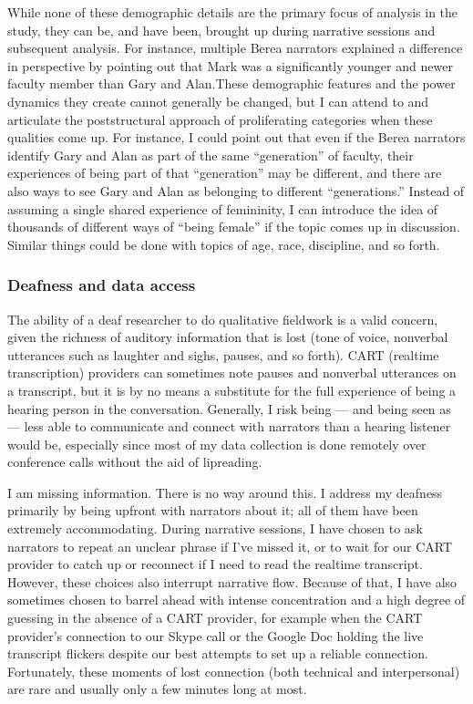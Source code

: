 While none of these demographic details are the primary focus of analysis in the study, they can be, and have been, brought up during narrative sessions and subsequent analysis. For instance, multiple Berea narrators explained a difference in perspective by pointing out that Mark was a significantly younger and newer faculty member than Gary and Alan.These demographic features and the power dynamics they create cannot generally be changed, but I can attend to and articulate the poststructural approach of proliferating categories when these qualities come up. For instance, I could point out that even if the Berea narrators identify Gary and Alan as part of the same “generation” of faculty, their experiences of being part of that “generation” may be different, and there are also ways to see Gary and Alan as belonging to different “generations.” Instead of assuming a single shared experience of femininity, I can introduce the idea of thousands of different ways of “being female” if the topic comes up in discussion. Similar things could be done with topics of age, race, discipline, and so forth.

\subsubsection{Deafness and data access}

The ability of a deaf researcher to do qualitative fieldwork is a valid concern, given the richness of auditory information that is lost (tone of voice, nonverbal utterances such as laughter and sighs, pauses, and so forth). CART (realtime transcription) providers can sometimes note pauses and nonverbal utterances on a transcript, but it is by no means a substitute for the full experience of being a hearing person in the conversation. Generally, I risk being — and being seen as — less able to communicate and connect with narrators than a hearing listener would be, especially since most of my data collection is done remotely over conference calls without the aid of lipreading.

I am missing information. There is no way around this. I address my deafness primarily by being upfront with narrators about it; all of them have been extremely accommodating. During narrative sessions, I have chosen to ask narrators to repeat an unclear phrase if I’ve missed it, or to wait for our CART provider to catch up or reconnect if I need to read the realtime transcript. However, these choices also interrupt narrative flow. Because of that, I have also sometimes chosen to barrel ahead with intense concentration and a high degree of guessing in the absence of a CART provider, for example when the CART provider’s connection to our Skype call or the Google Doc holding the live transcript flickers despite our best attempts to set up a reliable connection. Fortunately, these moments of lost connection (both technical and interpersonal) are rare and usually only a few minutes long at most.

